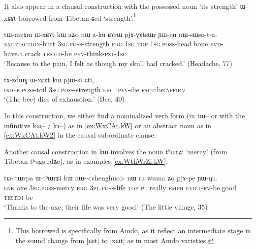 \documentclass[oldfontcommands,oneside,a4paper,11pt]{article}
\newcommand{\ipa}[1]{{\phon #1}} %
\begin{document}
  It also appear in a clausal construction with the possessed noun `its strength' \ipa{ɯ-xɕɤt} borrowed from Tibetan \ipa{ɕed} `strength'.\footnote{This borrowed is specifically from Amdo, as it reflect an intermediate stage in the sound change from [ɕet] to [xɕit] as in most Amdo varieties.}

 

\begin{exe}
\ex \label{ex:WxCAt.kW}
\gll
\ipa{tɯ-mŋɤm} 	\ipa{ɯ-xɕɤt} 	\ipa{kɯ} 	\ipa{aʑo} 	\ipa{nɯ} 	\ipa{a-ku} 	\ipa{ɕɤrɯ} 	\ipa{pjɤ-ɣɤtsɯr} 	\ipa{ɲɯ-ŋu} 	\ipa{nɯ-sɯso-t-a.} 	\\
\textsc{nmlz:action}-hurt \textsc{3sg.poss}-strength \textsc{erg} \textsc{1sg} \textsc{top} \textsc{1sg.poss}-head bone \textsc{evd}-have.a.crack \textsc{testim}-be \textsc{pfv}-think-\textsc{pst-1sg} \\
\glt `Because to the pain, I felt as though my skull had cracked.' (Headache, 77)
  \end{exe}

  \begin{exe}
\ex \label{ex:WxCAt.kW2}
\gll
  \ipa{tɤ-zdɯɣ} 	\ipa{ɯ-xɕɤt} 	\ipa{kɯ} 	\ipa{pjɯ-si} 	\ipa{ɕti,} \\
  \textsc{indef.poss}-toil  \textsc{3sg.poss}-strength \textsc{erg} \textsc{ipfv}-die \textsc{fact}:be:\textsc{affirm} \\
 \glt `(The bee) dies of exhaustion.' (Bee, 40)
  \end{exe}
  
In this construction, we either find a nominalized verb form (in \ipa{tɯ--} or with the infinitive \ipa{kɯ--} / \ipa{kɤ--}) as in \ref{ex:WxCAt.kW} or an abstract noun as in \ref{ex:WxCAt.kW2} in the causal subordinate clause.

Another causal construction in \ipa{kɯ} involves the noun \ipa{tʰɯrʑi} `mercy' (from Tibetan \ipa{tʰugs.rdʑe}), as in examples \ref{ex:WthWrZi.kW}.

  \begin{exe}
\ex \label{ex:WthWrZi.kW}
\gll
\ipa{tɕe}  	\ipa{tɯrpa}  	\ipa{ɯ-tʰɯrʑi}  	\ipa{kɯ}  	\ipa{nɯ}-<shenghuo>  	\ipa{nɯ} \ipa{ra}  	\ipa{wuma}  	\ipa{ʑo}  	\ipa{pjɤ-pe}  	\ipa{ɲɯ-ŋu.}  \\
\textsc{lnk} axe \textsc{3sg.poss}-mercy \textsc{erg} \textsc{3pl.poss}-life \textsc{top} \textsc{pl} really \textsc{emph} \textsc{evd.ipfv}-be.good \textsc{testim}-be \\
\glt `Thanks to the axe, their life was very good.' (The little village, 35)
  \end{exe}
  
\end{document}
